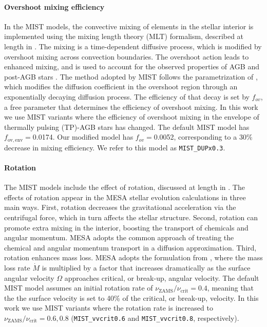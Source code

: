 \paragraph{Overshoot mixing efficiency} In the MIST models, the convective mixing of elements in the stellar interior is implemented using the mixing length theory (MLT) formalism, described at length in \citet{Choi+2016}. The mixing is a time-dependent diffusive process, which is modified by overshoot mixing across convection boundaries. The overshoot action leads to enhanced mixing, and is used to account for the observed properties of AGB and post-AGB stars \citep{Herwig+2000}. The method adopted by MIST follows the parametrization of \citet{Herwig+2000}, which modifies the diffusion coefficient in the overshoot region through an exponentially decaying diffusion process. The efficiency of that decay is set by $f_{ov}$, a free parameter that determines the efficiency of overshoot mixing. In this work we use MIST variants where the efficiency of overshoot mixing in the envelope of thermally pulsing (TP)-AGB stars has changed. The default MIST model has $f_{\mathrm{ov, env}}=$0.0174. Our modified model has $f_{ov}=$0.0052, corresponding to a 30\% decrease in mixing efficiency. We refer to this model as {\tt MIST\_DUPx0.3}.

\paragraph{Rotation} The MIST models include the effect of rotation, discussed at length in \citet{Choi+2017}. The effects of rotation appear in the MESA stellar evolution calculations in three main ways. First, rotation decreases the gravitational acceleration via the centrifugal force, which in turn affects the stellar structure. Second, rotation can promote extra mixing in the interior, boosting the transport of chemicals and angular momentum. MESA adopts the common approach of treating the chemical and angular momentum transport in a diffusion approximation. Third, rotation enhances mass loss. MESA adopts the formulation from \citet{Langer+1998}, where the mass loss rate $\dot{M}$ is multiplied by a factor that increases dramatically as the surface angular velocity $\Omega$ approaches critical, or break-up, angular velocity. The default MIST model assumes an initial rotation rate of  $\nu_{\mathrm{ZAMS}}/\nu_{\mathrm{crit}} = 0.4$, meaning that the the surface velocity is set to 40\% of the critical, or break-up, velocity. In this work we use MIST variants where the rotation rate is increased to $\nu_{\mathrm{ZAMS}}/\nu_{\mathrm{crit}} = 0.6,0.8$ ({\tt MIST\_vvcrit0.6} and {\tt MIST\_vvcrit0.8}, respectively).

